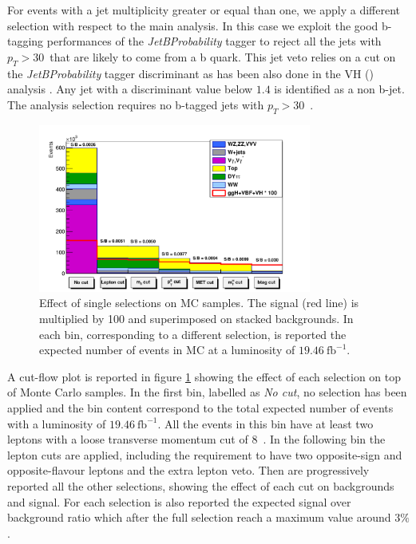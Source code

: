 For events with a jet multiplicity greater or equal than one, we apply a different selection with respect to the main analysis. In this case we exploit the good b-tagging performances of the \textit{JetBProbability} tagger to reject all the jets with $p_T > 30$~\GeV that are likely to come from a b quark. This jet veto relies on a cut on the \textit{JetBProbability} tagger discriminant as has been also done in the VH (\hwwllnn) analysis \cite{CMS_PAS_HIG_13-017}. Any jet with a discriminant value below $1.4$ is identified as a non b-jet. The analysis selection requires no b-tagged jets with $p_T > 30$~\GeV.

\begin{figure}[b]
\centering
\includegraphics[width=0.8\textwidth]{images/cutflow2.pdf}
\caption{Effect of single selections on MC samples. The signal (red line) is multiplied by 100 and superimposed on stacked backgrounds. In each bin, corresponding to a different selection, is reported the expected number of events in MC at a luminosity of $19.46~\mathrm{fb}^{-1}$.\label{fig:cutflow}}
\end{figure}

A  cut-flow plot is reported in figure \ref{fig:cutflow} showing the effect of each selection on top of Monte Carlo samples. In the first bin, labelled as \textit{No cut}, no selection has been applied and the bin content correspond to the total expected number of events with a luminosity of $19.46~\mathrm{fb}^{-1}$. All the events in this bin have at least two leptons with a loose transverse momentum cut of $8$~\GeV. In the following bin the lepton cuts are applied, including the requirement to have two opposite-sign and opposite-flavour leptons and the extra lepton veto. Then are progressively reported all the other selections, showing the effect of each cut on backgrounds and signal. For each selection is also reported the expected signal over background ratio which after the full selection reach a maximum value around $3\%$.

